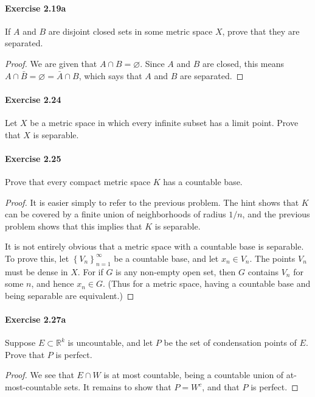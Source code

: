 \documentclass{article}
\theoremstyle{definition}
\begin{document}
\paragraph{Exercise 2.19a} If $A$ and $B$ are disjoint closed sets in some metric space $X$, prove that they are separated.
\begin{proof}
    We are given that $A \cap B=\varnothing$. Since $A$ and $B$ are closed, this means $A \cap \bar{B}=\varnothing=\bar{A} \cap B$, which says that $A$ and $B$ are separated.
\end{proof}


\paragraph{Exercise 2.24} Let $X$ be a metric space in which every infinite subset has a limit point. Prove that $X$ is separable.

\paragraph{Exercise 2.25} Prove that every compact metric space $K$ has a countable base.
\begin{proof}
    It is easier simply to refer to the previous problem. The hint shows that $K$ can be covered by a finite union of neighborhoods of radius $1 / n$, and the previous problem shows that this implies that $K$ is separable.

It is not entirely obvious that a metric space with a countable base is separable. To prove this, let $\left\{V_n\right\}_{n=1}^{\infty}$ be a countable base, and let $x_n \in V_n$. The points $V_n$ must be dense in $X$. For if $G$ is any non-empty open set, then $G$ contains $V_n$ for some $n$, and hence $x_n \in G$. (Thus for a metric space, having a countable base and being separable are equivalent.)
\end{proof}


\paragraph{Exercise 2.27a} Suppose $E\subset\mathbb{R}^k$ is uncountable, and let $P$ be the set of condensation points of $E$. Prove that $P$ is perfect.
\begin{proof}
    We see that $E \cap W$ is at most countable, being a countable union of at-most-countable sets. It remains to show that $P=W^c$, and that $P$ is perfect.
\end{proof}
\end{document}
